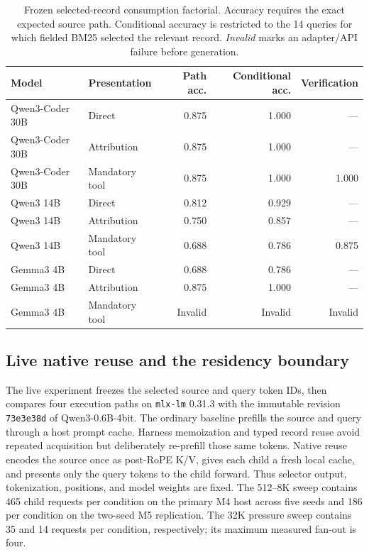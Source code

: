 \documentclass[11pt]{article}
\begin{document}
\begin{table}[H]
\centering
\small
\caption{Frozen selected-record consumption factorial. Accuracy requires the
exact expected source path. Conditional accuracy is restricted to the 14
queries for which fielded BM25 selected the relevant record. \emph{Invalid} marks
an adapter/API failure before generation.}
\label{tab:consumption-factorial}
\begin{tabular}{llrrr}
\toprule
Model & Presentation & Path acc. & Conditional acc. & Verification \\
\midrule
Qwen3-Coder 30B & Direct & 0.875 & 1.000 & --- \\
Qwen3-Coder 30B & Attribution & 0.875 & 1.000 & --- \\
Qwen3-Coder 30B & Mandatory tool & 0.875 & 1.000 & 1.000 \\
Qwen3 14B & Direct & 0.812 & 0.929 & --- \\
Qwen3 14B & Attribution & 0.750 & 0.857 & --- \\
Qwen3 14B & Mandatory tool & 0.688 & 0.786 & 0.875 \\
Gemma3 4B & Direct & 0.688 & 0.786 & --- \\
Gemma3 4B & Attribution & 0.875 & 1.000 & --- \\
Gemma3 4B & Mandatory tool & Invalid & Invalid & Invalid \\
\bottomrule
\end{tabular}
\end{table}

\subsection{Live native reuse and the residency boundary}

The live experiment freezes the selected source and query token IDs, then
compares four execution paths on \texttt{mlx-lm} 0.31.3 with the immutable
revision \texttt{73e3e38d} of Qwen3-0.6B-4bit. The ordinary baseline prefills
the source and query through a host prompt cache. Harness memoization and typed
record reuse avoid repeated acquisition but deliberately re-prefill those same
tokens. Native reuse encodes the source once as post-RoPE K/V, gives each child
a fresh local cache, and presents only the query tokens to the child forward.
Thus selector output, tokenization, positions, and model weights are fixed.
The 512--8K sweep contains 465 child requests per condition on the primary M4
host across five seeds and 186 per condition on the two-seed M5 replication.
The 32K pressure sweep contains 35 and 14 requests per condition, respectively;
its maximum measured fan-out is four.
\end{document}
